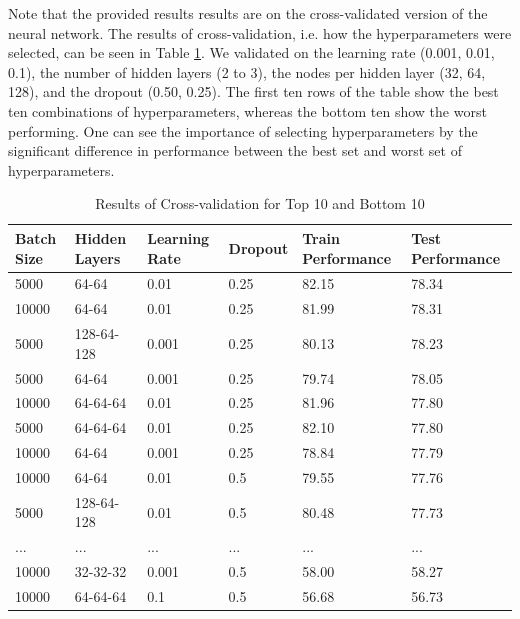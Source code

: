 Note that the provided results results are on the cross-validated version of the neural network. The results of cross-validation, i.e. how the hyperparameters were selected, can be seen in Table \ref{tab:crossval}. We validated on the learning rate (0.001, 0.01, 0.1), the number of hidden layers (2 to 3), the nodes per hidden layer (32, 64, 128), and the dropout (0.50, 0.25). The first ten rows of the table show the best ten combinations of hyperparameters, whereas the bottom ten show the worst performing. One can see the importance of selecting hyperparameters by the significant difference in performance between the best set and worst set of hyperparameters.\\
\begin{table}[]
\centering
\caption{Results of Cross-validation for Top 10 and Bottom 10}
\label{tab:crossval}
\begin{tabular}{llllll}
\textbf{Batch Size} & \textbf{Hidden Layers} & \textbf{Learning Rate} & \textbf{Dropout} & \textbf{Train Performance} & \textbf{Test Performance} \\ \hline
5000       & 64-64         & 0.01          & 0.25    & 82.15            & 78.34           \\
10000      & 64-64         & 0.01          & 0.25    & 81.99            & 78.31           \\
5000       & 128-64-128    & 0.001         & 0.25    & 80.13            & 78.23           \\
5000       & 64-64         & 0.001         & 0.25    & 79.74            & 78.05           \\
10000      & 64-64-64      & 0.01          & 0.25    & 81.96            & 77.80           \\
5000       & 64-64-64      & 0.01          & 0.25    & 82.10            & 77.80           \\
10000      & 64-64         & 0.001         & 0.25    & 78.84            & 77.79           \\
10000      & 64-64         & 0.01          & 0.5     & 79.55            & 77.76           \\
5000       & 128-64-128    & 0.01          & 0.5     & 80.48            & 77.73           \\
...        & ...           & ...           & ...     & ...              & ...             \\
10000      & 32-32-32      & 0.001         & 0.5     & 58.00            & 58.27           \\
10000      & 64-64-64      & 0.1           & 0.5     & 56.68            & 56.73           \\

\end{tabular}
\end{table}
